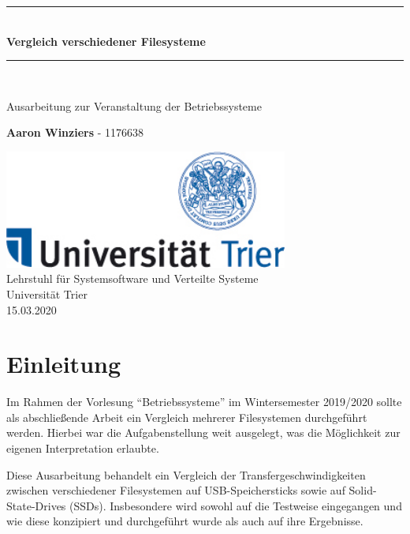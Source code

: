 \documentclass[11pt,parskip=full]{scrartcl}
\newcommand{\HRule}[1]{\rule{\linewidth}{#1}}
\begin{document}
	
\begin{titlepage}
	\begin{center}
		\vspace*{2cm}
		\HRule{1pt} \\
		\vspace{.5 cm}
		\textbf{\Huge Vergleich verschiedener Filesysteme}
		\HRule{2pt} \\ [1cm]
		
		\vspace{1.5cm}
		
		\Large{
			Ausarbeitung zur Veranstaltung der Betriebssysteme
		}
		\vspace{1.5cm}
		
		\textbf{\Large Aaron Winziers} - \large 1176638
		
		\vfill
		
		\includegraphics[width=0.7\textwidth]{Logo-Uni-Trier}\\
		[1cm]
		Lehrstuhl für Systemsoftware und Verteilte Systeme\\
		Universität Trier\\
		15.03.2020
		
	\end{center}
\end{titlepage}
\newpage
	
\section{Einleitung}

	Im Rahmen der Vorlesung ``Betriebssysteme'' im Wintersemester 2019/2020 sollte als abschließende Arbeit ein Vergleich mehrerer Filesystemen durchgeführt werden. Hierbei war die Aufgabenstellung weit ausgelegt, was die Möglichkeit zur eigenen Interpretation erlaubte.
	
	Diese Ausarbeitung behandelt ein Vergleich der Transfergeschwindigkeiten zwischen verschiedener Filesystemen auf USB-Speichersticks sowie auf Solid-State-Drives (SSDs). Insbesondere wird sowohl auf die Testweise eingegangen und wie diese konzipiert und durchgeführt wurde als auch auf ihre Ergebnisse.
\end{document}

